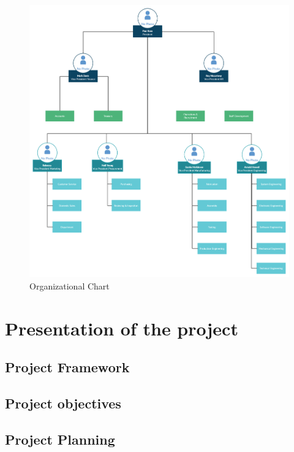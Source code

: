 \begin{figure}[H] 
    \centering
    \includegraphics[width=12cm]{Figures/Organizational_Chart.png}
    \caption{Organizational Chart}
\end{figure}











\section{Presentation of the project}


\subsection{Project Framework}



\subsection{Project objectives}





\subsection{Project Planning}

